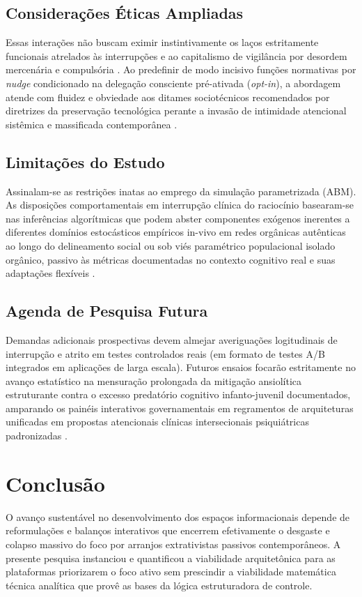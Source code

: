 \subsection{Considerações Éticas Ampliadas}
Essas interações não buscam eximir instintivamente os laços estritamente funcionais atrelados às interrupções e ao capitalismo de vigilância por desordem mercenária e compulsória \citep{zuboff2019, citton2017}. Ao predefinir de modo incisivo funções normativas por \textit{nudge} condicionado na delegação consciente pré-ativada (\textit{opt-in}), a abordagem atende com fluidez e obviedade aos ditames sociotécnicos recomendados por diretrizes da preservação tecnológica perante a invasão de intimidade atencional sistêmica e massificada contemporânea \citep{cht2026}.

\subsection{Limitações do Estudo}
Assinalam-se as restrições inatas ao emprego da simulação parametrizada (ABM). As disposições comportamentais em interrupção clínica do raciocínio basearam-se nas inferências algorítmicas que podem abster componentes exógenos inerentes a diferentes domínios estocásticos empíricos in-vivo em redes orgânicas autênticas ao longo do delineamento social ou sob viés paramétrico populacional isolado orgânico, passivo às métricas documentadas no contexto cognitivo real e suas adaptações flexíveis \citep{lyngs2019, kushlev2022}.

\subsection{Agenda de Pesquisa Futura}
Demandas adicionais prospectivas devem almejar averiguações logitudinais de interrupção e atrito em testes controlados reais (em formato de testes A/B integrados em aplicações de larga escala). Futuros ensaios focarão estritamente no avanço estatístico na mensuração prolongada da mitigação ansiolítica estruturante contra o excesso predatório cognitivo infanto-juvenil documentados, amparando os painéis interativos governamentais em regramentos de arquiteturas unificadas em propostas atencionais clínicas intersecionais psiquiátricas padronizadas \citep{brasil_sd, hai2021, costello2023}.

\section{Conclusão} \label{sec:conclusion}
O avanço sustentável no desenvolvimento dos espaços informacionais depende de reformulações e balanços interativos que encerrem efetivamente o desgaste e colapso massivo do foco por arranjos extrativistas passivos contemporâneos. A presente pesquisa instanciou e quantificou a viabilidade arquitetônica para as plataformas priorizarem o foco ativo sem prescindir a viabilidade matemática técnica analítica que provê as bases da lógica estruturadora de controle. 

